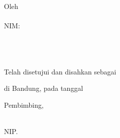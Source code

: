 
\clearpage

\begin{center}

    \large\bfseries\MakeUppercase{\judulta}

    \vfill

    \large \subtitle

    \vfill

    \normalsize Oleh \\[0.3em]
    \large \MakeUppercase{\penulis} \\[0.2em]
    NIM: \nim \\

    \prodi \\
	\normalsize \normalfont
	\fakultasplain \\
	\itb \\

    \vfill

    Telah disetujui dan disahkan sebagai \subtitle \\ 
    di Bandung, pada tanggal \tanggal~\bulan~\tahun

    \vspace{0.5cm}

    Pembimbing,

    \vspace{3cm}
    
    \underline{\pembimbing}\\
    NIP. \nip

    \vfill
    
\end{center}

\clearpage
